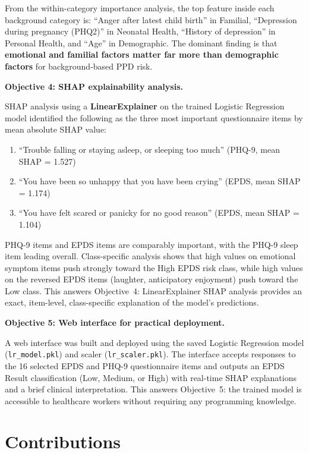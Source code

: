 From the within-category importance analysis, the top feature inside each background category is: ``Anger after latest child birth'' in Familial, ``Depression during pregnancy (PHQ2)'' in Neonatal Health, ``History of depression'' in Personal Health, and ``Age'' in Demographic.
The dominant finding is that \textbf{emotional and familial factors matter far more than demographic factors} for background-based PPD risk.

\textbf{Objective 4: SHAP explainability analysis.}

SHAP analysis using a \textbf{LinearExplainer} on the trained Logistic Regression model identified the following as the three most important questionnaire items by mean absolute SHAP value:
\begin{enumerate}
    \item ``Trouble falling or staying asleep, or sleeping too much'' (PHQ-9, mean SHAP = 1.527)
    \item ``You have been so unhappy that you have been crying'' (EPDS, mean SHAP = 1.174)
    \item ``You have felt scared or panicky for no good reason'' (EPDS, mean SHAP = 1.104)
\end{enumerate}
PHQ-9 items and EPDS items are comparably important, with the PHQ-9 sleep item leading overall.
Class-specific analysis shows that high values on emotional symptom items push strongly toward the High EPDS risk class, while high values on the reversed EPDS items (laughter, anticipatory enjoyment) push toward the Low class.
This answers Objective~4: LinearExplainer SHAP analysis provides an exact, item-level, class-specific explanation of the model's predictions.

\textbf{Objective 5: Web interface for practical deployment.}

A web interface was built and deployed using the saved Logistic Regression model (\texttt{lr\_model.pkl}) and scaler (\texttt{lr\_scaler.pkl}).
The interface accepts responses to the 16 selected EPDS and PHQ-9 questionnaire items and outputs an EPDS Result classification (Low, Medium, or High) with real-time SHAP explanations and a brief clinical interpretation.
This answers Objective~5: the trained model is accessible to healthcare workers without requiring any programming knowledge.

\section{Contributions}
\label{ch5-sec-contributions}

